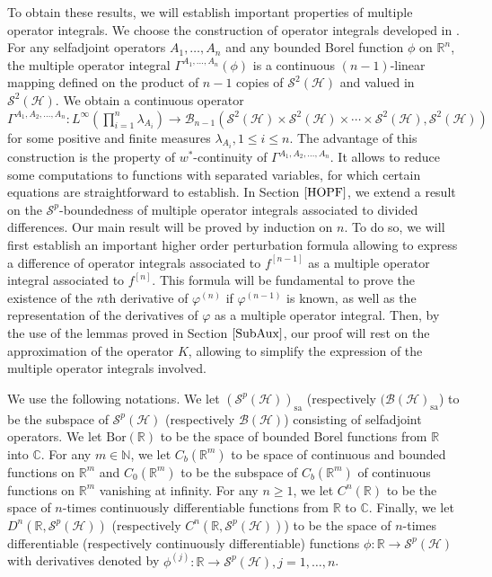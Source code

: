 \documentclass[12pt]{amsart}
\theoremstyle{remark}
\begin{document}
To obtain these results, we will establish important properties of multiple operator integrals. We choose the construction of operator integrals developed in \cite{CLS}. For any selfadjoint operators $A_1, \ldots, A_n$ and any bounded Borel function $\phi$ on $\mathbb{R}^{n}$, the multiple operator integral $\Gamma^{A_1, \ldots, A_n}(\phi)$ is a continuous $(n-1)$-linear mapping defined on the product of $n-1$ copies of $\mathcal{S}^2(\mathcal{H})$ and valued in $\mathcal{S}^2(\mathcal{H})$. We obtain a continuous operator
$
\Gamma^{A_1,A_2, \ldots, A_n} : L^{\infty}\left(\prod_{i=1}^n
\lambda_{A_i}\right) \rightarrow \mathcal{B}_{n-1}(\mathcal{S}^2(\mathcal{H}) \times \mathcal{S}^2(\mathcal{H})
\times \cdots \times \mathcal{S}^2(\mathcal{H}), \mathcal{S}^2(\mathcal{H}))
$
for some positive and finite measures $\lambda_{A_i}, 1 \leq i \leq n$. The advantage of this construction is the property of $w^*$-continuity of $\Gamma^{A_1,A_2, \ldots, A_n}$. It allows to reduce some computations to functions with separated variables, for which certain equations are straightforward to establish. In Section $\ref{HOPF}$, we extend a result on the $\mathcal{S}^p$-boundedness of multiple operator integrals associated to divided differences. Our main result will be proved by induction on $n$. To do so, we will first establish an important higher order perturbation formula allowing to express a difference of operator integrals associated to $f^{[n-1]}$ as a multiple operator integral associated to $f^{[n]}$. This formula will be fundamental to prove the existence of the $n$th derivative of $\varphi^{(n)}$ if $\varphi^{(n-1)}$ is known, as well as the representation of the derivatives of $\varphi$ as a multiple operator integral. Then, by the use of the lemmas proved in Section $\ref{SubAux}$, our proof will rest on the approximation of the operator $K$, allowing to simplify the expression of the multiple operator integrals involved.



We use the following notations. We let $(\mathcal{S}^p(\mathcal{H}))_{\text{sa}}$ (respectively $(\mathcal{B}(\mathcal{H})_{\text{sa}}$) to be the subspace of $\mathcal{S}^p(\mathcal{H})$ (respectively $\mathcal{B}(\mathcal{H})$) consisting of selfadjoint operators. We let $\text{Bor}(\mathbb{R})$ to be the space of bounded Borel functions from $\mathbb{R}$ into $\mathbb{C}$. For any $m\in \mathbb{N}$, we let $C_b(\mathbb{R}^m)$ to be space of continuous and bounded functions on $\mathbb{R}^{m}$ and $C_0(\mathbb{R}^m)$ to be the subspace of $C_b(\mathbb{R}^m)$ of continuous functions on $\mathbb{R}^m$ vanishing at infinity. For any $n\geq 1$, we let $C^n(\mathbb{R})$ to be the space of $n$-times continuously differentiable functions from $\mathbb{R}$ to $\mathbb{C}$. Finally, we let $D^n(\mathbb{R}, \mathcal{S}^p(\mathcal{H}))$ (respectively $C^n(\mathbb{R}, \mathcal{S}^p(\mathcal{H}))$) to be the space of $n$-times differentiable (respectively continuously differentiable) functions $\phi : \mathbb{R} \to \mathcal{S}^p(\mathcal{H})$ with derivatives denoted by $\phi^{(j)} : \mathbb{R} \to \mathcal{S}^p(\mathcal{H}), j=1, \ldots, n$.
\end{document}
